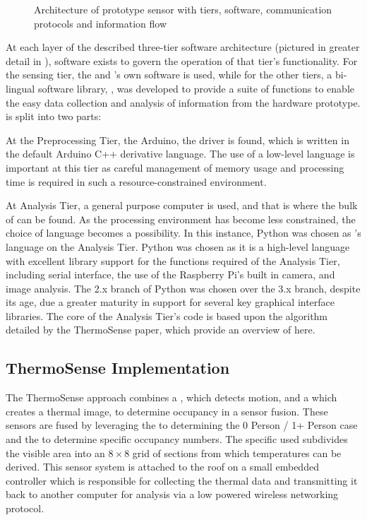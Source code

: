 \documentclass[../thesis/thesis.tex]{subfiles}
\begin{document}
\begin{figure}
\centering

\caption{Architecture of prototype sensor with tiers, software, communication protocols and information flow}
\label{fig:pictures:protob-arch}
\end{figure}

At each layer of the described three-tier software architecture (pictured in greater detail in ), software exists to govern the operation of that tier's functionality. For the sensing tier, the \mlx and \pir's own software is used, while for the other tiers, a bi-lingual software library, \tarl, was developed to provide a suite of functions to enable the easy data collection and analysis of information from the hardware prototype. \tarl is split into two parts:

At the Preprocessing Tier, the Arduino, the \tarl \mlx driver is found, which is written in the default Arduino C++ derivative language. The use of a low-level language is important at this tier as careful management of memory usage and processing time is required in such a resource-constrained environment.

At Analysis Tier, a general purpose computer is used, and that is where the bulk of \tarl can be found. As the processing environment has become less constrained, the choice of language becomes a possibility. In this instance, Python was chosen as \tarl's language on the Analysis Tier. Python was chosen as it is a high-level language with excellent library support for the functions required of the Analysis Tier, including serial interface, the use of the Raspberry Pi's built in camera, and image analysis. The 2.x branch of Python was chosen over the 3.x branch, despite its age, due a greater maturity in support for several key graphical interface libraries. The core of the Analysis Tier's code is based upon the algorithm detailed by the ThermoSense paper, which provide an overview of here.

\subsection{ThermoSense Implementation}
\label{subsec:thermosenseimplementation}
The ThermoSense approach combines a \pir, which detects motion, and a \iar which creates a thermal image, to determine occupancy in a sensor fusion. These sensors are fused by leveraging the \pir to determining the 0 Person / 1+ Person case and the \iar to determine specific occupancy numbers. The specific \iar used subdivides the visible area into an $8\times8$ grid of sections from which temperatures can be derived. This sensor system is attached to the roof on a small embedded controller which is responsible for collecting the thermal data and transmitting it back to another computer for analysis via a low powered wireless networking protocol. 
\end{document}
